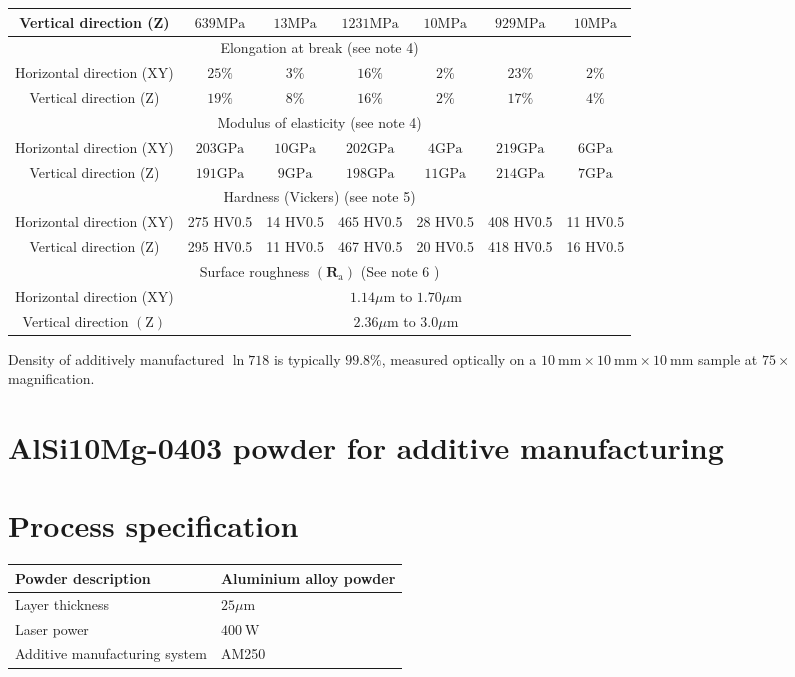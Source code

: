 \documentclass[10pt]{article}
\begin{document}
\begin{center}
\begin{tabular}{|c|c|c|c|c|c|c|}
\hline
Vertical direction (Z) & $639 \mathrm{MPa}$ & $13 \mathrm{MPa}$ & $1231 \mathrm{MPa}$ & $10 \mathrm{MPa}$ & $929 \mathrm{MPa}$ & $10 \mathrm{MPa}$ \\
\hline
\multicolumn{7}{|c|}{Elongation at break (see note 4)} \\
\hline
Horizontal direction (XY) & $25 \%$ & $3 \%$ & $16 \%$ & $2 \%$ & $23 \%$ & $2 \%$ \\
\hline
Vertical direction (Z) & $19 \%$ & $8 \%$ & $16 \%$ & $2 \%$ & $17 \%$ & $4 \%$ \\
\hline
\multicolumn{7}{|c|}{Modulus of elasticity (see note 4)} \\
\hline
Horizontal direction (XY) & $203 \mathrm{GPa}$ & $10 \mathrm{GPa}$ & $202 \mathrm{GPa}$ & $4 \mathrm{GPa}$ & $219 \mathrm{GPa}$ & $6 \mathrm{GPa}$ \\
\hline
Vertical direction (Z) & $191 \mathrm{GPa}$ & $9 \mathrm{GPa}$ & $198 \mathrm{GPa}$ & $11 \mathrm{GPa}$ & $214 \mathrm{GPa}$ & $7 \mathrm{GPa}$ \\
\hline
\multicolumn{7}{|c|}{Hardness (Vickers) (see note 5)} \\
\hline
Horizontal direction (XY) & 275 HV0.5 & 14 HV0.5 & 465 HV0.5 & 28 HV0.5 & 408 HV0.5 & 11 HV0.5 \\
\hline
Vertical direction (Z) & 295 HV0.5 & 11 HV0.5 & 467 HV0.5 & 20 HV0.5 & 418 HV0.5 & 16 HV0.5 \\
\hline
\multicolumn{7}{|c|}{Surface roughness $\left(\mathbf{R}_{\mathrm{a}}\right)$ (See note 6 )} \\
\hline
Horizontal direction (XY) & \multicolumn{6}{|c|}{$1.14 \mu \mathrm{m}$ to $1.70 \mu \mathrm{m}$} \\
\hline
Vertical direction $(\mathrm{Z})$ & \multicolumn{6}{|c|}{$2.36 \mu \mathrm{m}$ to $3.0 \mu \mathrm{m}$} \\
\hline
\end{tabular}
\end{center}

Density of additively manufactured $\ln 718$ is typically $99.8 \%$, measured optically on a $10 \mathrm{~mm} \times 10 \mathrm{~mm} \times 10 \mathrm{~mm}$ sample at $75 \times$ magnification.

\section*{AlSi10Mg-0403 powder for additive manufacturing}
\section*{Process specification}
\begin{center}
\begin{tabular}{|l|l|}
\hline
Powder description & Aluminium alloy powder \\
\hline
Layer thickness & $25 \mu \mathrm{m}$ \\
\hline
Laser power & $400 \mathrm{~W}$ \\
\hline
Additive manufacturing system & AM250 \\
\hline
\end{tabular}
\end{center}
\end{document}
